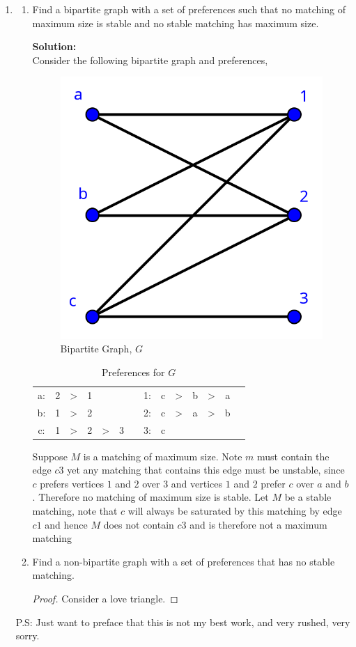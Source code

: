 \documentclass[12pt]{article}
\newcommand{\localhead}[1]{\par\smallskip\textbf{#1}\nobreak\\}%
\newcommand\solution{\localhead{Solution:}}
\begin{document}
\begin{enumerate}
	\item 
	\begin{enumerate}
		\item Find a bipartite graph with a set of preferences such that no matching of maximum size is stable and no stable matching has maximum size. 
		\solution Consider the following bipartite graph and preferences,
		
		
		\begin{figure}[H]
			\begin{center}
				\caption{Bipartite Graph, $G$}
				\includegraphics[width=.20\textwidth]{PartiteGraph.png}
			\end{center}
		\end{figure}
		\begin{table}[H]
			\caption{Preferences for $G$}
			\begin{center}
				\begin{tabular}{cccccccc cccccc}
					a:&2&>&1& & & \qquad\qquad    &1:&c&>&b&>&a\\ 
					b:&1&>&2& & & \qquad\qquad     &2:&c&>&a&>&b\\
					c:&1&>&2&>&3& \qquad\qquad &3:&c\\
				\end{tabular}
			\end{center}
		\end{table}
		Suppose $M$ is a matching of maximum size. Note $m$ must contain the edge $c3$ yet any matching that contains this edge must be unstable, since $c$ prefers vertices $1$ and $2$ over $3$ and vertices $1$ and $2$ prefer $c$ over $a$ and $b$. Therefore no matching of maximum size is stable. Let $M$ be a stable matching, note that $c$ will always be saturated by this matching by edge $c1$ and hence $M$ does not contain $c3$ and is therefore not a maximum matching
		
		
		
		
		
		
		
		
		\item Find a non-bipartite graph with a set of preferences that has no stable matching.
		\begin{proof}
			Consider a love triangle. 
		\end{proof}
	\end{enumerate}
	P.S: Just want to preface that this is not my best work, and very rushed, very sorry. 
	\newpage
	

\end{enumerate}
\end{document}
